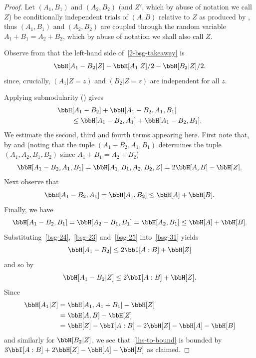 \begin{proof}
  
  \leanok
Let $(A_1, B_1)$ and $(A_2, B_2)$ (and $Z'$, which by abuse of notation we call $Z$) be conditionally independent trials of $(A,B)$ relative to $Z$ as produced by , thus $(A_1,B_1)$ and $(A_2,B_2)$ are coupled through the random variable $A_1 + B_1 = A_2 + B_2$, which by abuse of notation we shall also call $Z$.

Observe from  that the left-hand side of~\eqref{2-bsg-takeaway} is
\begin{equation}\label{lhs-to-bound}
\bbH[A_1 - B_2| Z] - \bbH[A_1 | Z]/2 - \bbH[B_2 | Z]/2.
\end{equation}
since, crucially, $(A_1 | Z=z)$ and $(B_2 | Z=z)$ are independent for all $z$.

Applying submodularity () gives
\begin{equation}\label{bsg-31} \begin{split}
&\bbH[A_1 - B_2] + \bbH[A_1 - B_2, A_1, B_1] \\
&\qquad \leq \bbH[A_1 - B_2, A_1] + \bbH[A_1 - B_2,B_1].
\end{split}\end{equation}
We estimate the second, third and fourth terms appearing here.
First note that, by  and  (noting that the tuple $(A_1 - B_2, A_1, B_1)$  determines the tuple $(A_1, A_2, B_1, B_2)$ since $A_1+B_1=A_2+B_2$)
\begin{equation}\label{bsg-24} \bbH[A_1 - B_2, A_1, B_1] = \bbH[A_1, B_1, A_2, B_2,Z] = 2\bbH[A,B] - \bbH[Z].\end{equation}
Next observe that
\begin{equation}\label{bsg-23} \bbH[A_1 - B_2, A_1] = \bbH[A_1, B_2] \leq \bbH[A] + \bbH[B].
\end{equation}
Finally, we have
\begin{equation}\label{bsg-25} \bbH[A_1 - B_2, B_1] = \bbH[A_2 - B_1, B_1] = \bbH[A_2, B_1] \leq \bbH[A] + \bbH[B].\end{equation}
Substituting~\eqref{bsg-24},~\eqref{bsg-23} and~\eqref{bsg-25} into~\eqref{bsg-31} yields
\[\bbH[A_1 - B_2] \leq 2 \bbI[A:B] + \bbH[Z]\] and so by 
\[\bbH[A_1 - B_2 | Z]  \leq 2 \bbI[A:B] + \bbH[Z].\]
Since
\begin{align*} \bbH[A_1 | Z] & = \bbH[A_1, A_1 + B_1] - \bbH[Z] \\ & = \bbH[A,B] - \bbH[Z] \\ & = \bbH[Z] -  \bbI[A:B] - 2 \bbH[Z]- \bbH[A]-\bbH[B]\end{align*}
and similarly for $\bbH[B_2 | Z]$, we see that~\eqref{lhs-to-bound} is bounded by
$3 \bbI[A:B] + 2\bbH[Z]-\bbH[A]-\bbH[B]$ as claimed.
\end{proof}


